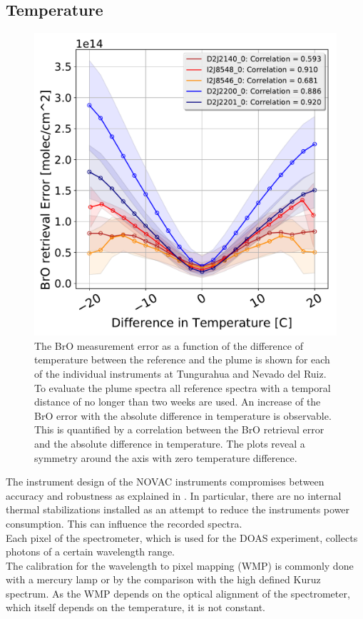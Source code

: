 \subsection{Temperature}
\begin{figure}
	\centering
	\includegraphics[width=0.7\linewidth]{Bilder/DiffTempallInstruments}
	\caption{The BrO measurement error as a function of the difference of temperature between the reference and the plume is shown for each of the individual instruments at Tungurahua and Nevado del Ruiz. To evaluate the plume spectra all reference spectra with a temporal distance of no longer than two weeks are used. An increase of the BrO error with the absolute difference in temperature is observable. This is quantified by a correlation between the BrO retrieval error and the absolute difference in temperature. The plots reveal a symmetry around the axis with zero temperature difference.}
	\label{fig:difftemp}
\end{figure}
The instrument design of the NOVAC instruments compromises between accuracy and robustness as explained in . In particular, there are no internal thermal stabilizations installed as an attempt to reduce the instruments power consumption. This can influence the recorded spectra.\\	
Each pixel of the spectrometer, which is used for the DOAS experiment, collects photons of a certain wavelength range.\\
The calibration for the wavelength to pixel mapping (WMP) is commonly done with a mercury lamp or by the comparison with the high defined Kuruz spectrum.
As the WMP depends on the optical alignment of the spectrometer, which itself depends on the temperature, it is not constant.
